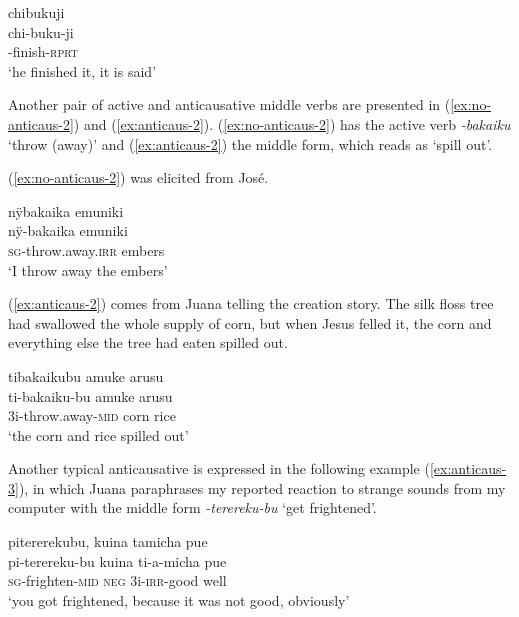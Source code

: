 \ea\label{ex:no-anticaus}
\begingl 
\glpreamble chibukuji\\
\gla chi-buku-ji\\ 
-finish-\textsc{rprt}\\ 
\glft ‘he finished it, it is said’\\ 
\endgl
 \trailingcitation{[rxx-n120511l-2.41]}
\xe

Another pair of active and anticausative middle verbs are presented in (\ref{ex:no-anticaus-2}) and (\ref{ex:anticaus-2}). (\ref{ex:no-anticaus-2}) has the active verb \textit{-bakaiku} ‘throw (away)’ and (\ref{ex:anticaus-2}) the middle form, which reads as ‘spill out’.

(\ref{ex:no-anticaus-2}) was elicited from José.

\ea\label{ex:no-anticaus-2}
\begingl 
\glpreamble nÿbakaika emuniki\\
\gla nÿ-bakaika emuniki\\ 
\textsc{sg}-throw.away.\textsc{irr} embers\\ 
\glft ‘I throw away the embers’\\ 
\endgl
 \trailingcitation{[oxx-e120414ls-1a.003]}%
\xe

(\ref{ex:anticaus-2}) comes from Juana telling the creation story. The silk floss tree had swallowed the whole supply of corn, but when Jesus felled it, the corn and everything else the tree had eaten spilled out.

\ea\label{ex:anticaus-2}
\begingl 
\glpreamble tibakaikubu amuke arusu\\
\gla ti-bakaiku-bu amuke arusu\\ 
\glb 3i-throw.away-\textsc{mid} corn rice\\ 
\glft ‘the corn and rice spilled out’\\ 
\endgl
 \trailingcitation{[jxx-n101013s-1.830]}
\xe

Another typical anticausative is expressed in the following example (\ref{ex:anticaus-3}), in which Juana paraphrases my reported reaction to strange sounds from my computer with the middle form \textit{-terereku-bu} ‘get frightened’.

\ea\label{ex:anticaus-3}
\begingl 
\glpreamble pitererekubu, kuina tamicha pue\\
\gla pi-terereku-bu kuina ti-a-micha pue\\ 
\textsc{sg}-frighten-\textsc{mid} \textsc{neg} 3i-\textsc{irr}-good well\\ 
\glft ‘you got frightened, because it was not good, obviously’\\ 
\endgl
 \trailingcitation{[jxx-p120430l-1.007]}
\xe{}

